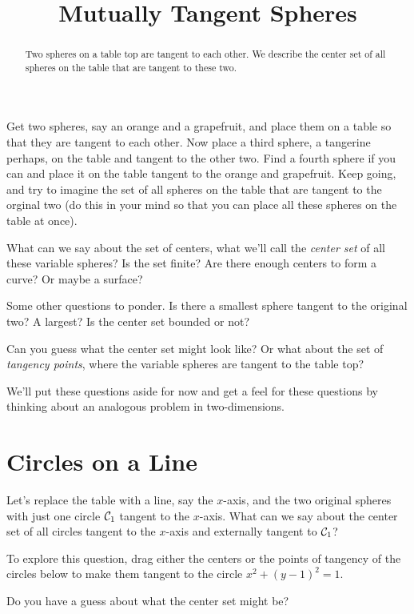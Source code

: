 \documentclass{ximera}
\title{Mutually Tangent Spheres}
\begin{document}
\begin{abstract}
Two spheres on a table top are tangent to each other. We describe the center set of all spheres on the table that are tangent to these two. 
\end{abstract}
\maketitle

Get two spheres, say an orange and a grapefruit, and place them on a table so that they are tangent to each other. Now place a third sphere, a tangerine perhaps, on the table and tangent to the other two. Find a fourth sphere if you can and place it on the table tangent to the orange and grapefruit. Keep going, and try to imagine the set of all spheres on the table that are tangent to the orginal two (do this in your mind so that you can place all these spheres on the table at once). 

What can we say about the set of centers, what we'll call the \emph{center set} of all these variable spheres? Is the set finite? Are there enough centers to form a curve? Or maybe a surface?

Some other questions to ponder. Is there a smallest sphere tangent to the original two? A largest? Is the center set bounded or not?

Can you guess what the center set might look like? Or what about the set of \emph{tangency points}, where the variable spheres are tangent to the table top?

We'll put these questions aside for now and get a feel for these questions by thinking about an analogous problem in two-dimensions.

\section{Circles on a Line}
\begin{exploration}
Let's replace the table with a line, say the $x$-axis, and the two original spheres with just one circle ${\cal C}_1$ tangent to the $x$-axis. What can we say about the center set of all circles tangent to the $x$-axis and externally tangent to ${\cal C}_1$?

To explore this question, drag either the centers or the points of tangency of the circles below to make them tangent to the circle $x^2 + (y-1)^2=1$.

Do  you have a guess about what the center set might be?

 
\begin{onlineOnly}
    \begin{center}
\end{center}
\end{onlineOnly}
\end{exploration}
\end{document}
